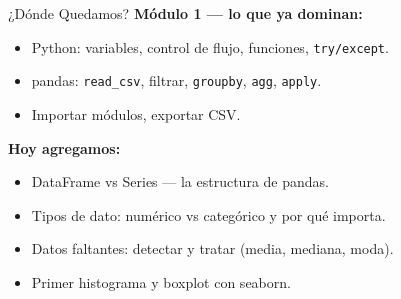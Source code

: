 \documentclass[aspectratio=169, 11pt]{beamer}
\begin{document}
\begin{frame}{¿Dónde Quedamos?}
  \vspace{-4pt}
  {\small\color{arcaDark}\bfseries Módulo 1 --- lo que ya dominan:}
  \vspace{4pt}
  {\footnotesize
  \begin{itemize}\setlength{\itemsep}{4pt}
    \item[{\color{codeGreen}\faCheckCircle}]
      Python: variables, control de flujo, funciones, \texttt{try/except}.
    \item[{\color{codeGreen}\faCheckCircle}]
      pandas: \texttt{read\_csv}, filtrar, \texttt{groupby}, \texttt{agg}, \texttt{apply}.
    \item[{\color{codeGreen}\faCheckCircle}]
      Importar módulos, exportar CSV.
  \end{itemize}
  }
  \vspace{8pt}
  {\small\color{arcaRed}\bfseries Hoy agregamos:}
  \vspace{4pt}
  {\footnotesize
  \begin{itemize}\setlength{\itemsep}{4pt}
    \item[{\color{arcaRed}\faArrowRight}]
      DataFrame vs Series --- la estructura de pandas.
    \item[{\color{arcaRed}\faArrowRight}]
      Tipos de dato: numérico vs categórico y por qué importa.
    \item[{\color{arcaRed}\faArrowRight}]
      Datos faltantes: detectar y tratar (media, mediana, moda).
    \item[{\color{arcaRed}\faArrowRight}]
      Primer histograma y boxplot con seaborn.
  \end{itemize}
  }
\end{frame}
\end{document}
